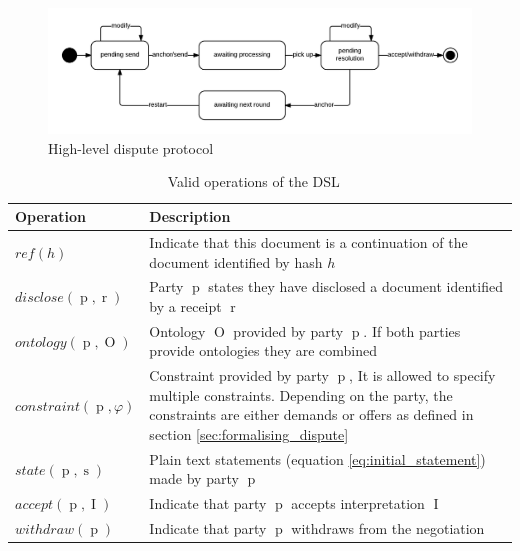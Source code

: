 \documentclass[12pt,msc,a4paper,oneside]{ucl_thesis}
\DeclareMathOperator{\adrreceipt}{r}
\DeclareMathOperator{\Metalang}{\mathcal{L}_m}
\DeclareMathOperator{\Interpretation}{I}
\DeclareMathOperator{\Ontology}{O}
\DeclareMathOperator{\statement}{s}
\DeclareMathOperator{\party}{p}
\begin{document}
\begin{figure}
    \includegraphics[width=\textwidth]{./figures/adr_dispute.png}
    \caption{High-level dispute protocol}
    \label{fig:adr_dispute}
\end{figure}

\begin{table}
    \centering
    \begin{tabularx}{\textwidth}{|l X|}
        \hline
        \textbf{Operation} & \textbf{Description} \\
        \hline
        $ref(h)$ & Indicate that this document is a continuation of the document identified by hash $h$ \\
        $disclose(\party, \adrreceipt)$ & Party $\party$ states they have disclosed a document identified by a receipt $\adrreceipt$ \\
        $ontology(\party, \Ontology)$ & Ontology $\Ontology$ provided by party $\party$. If both parties provide ontologies they are combined \\
        $constraint(\party, \varphi)$ & Constraint provided by party $\party$, It is allowed to specify multiple constraints. Depending on the party, the constraints are either demands or offers as defined in section \ref{sec:formalising_dispute} \\
        $state(\party, \statement)$ & Plain text statements (equation \ref{eq:initial_statement}) made by party $\party$ \\
        $accept(\party, \Interpretation)$ & Indicate that party $\party$ accepts interpretation $\Interpretation$ \\
        $withdraw(\party)$ & Indicate that party $\party$ withdraws from the negotiation \\
        \hline
    \end{tabularx}
    \label{tab:dsl_operations}
    \caption{Valid operations of the DSL $\Metalang$}
\end{table}
\end{document}
